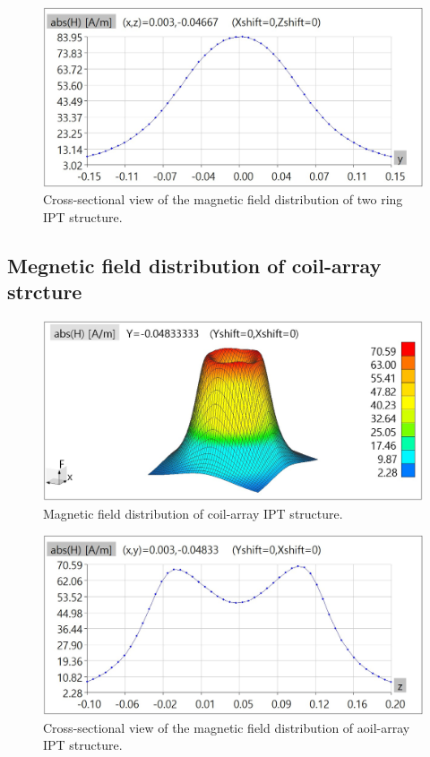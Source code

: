 \begin{figure}[!t]
    \centering
    \includegraphics[width=0.9\linewidth]{images/4_two_ring_near_field_distribution_cut.JPG}
    \caption{Cross-sectional view of the magnetic field distribution of two ring IPT structure.}
    \label{fig: magnetic distribution of two ring cut}
\end{figure}


\subsection{Megnetic field distribution of coil-array strcture}

\begin{figure}[!t]
    \centering
    \includegraphics[width=0.9\linewidth]{images/4_coil_array_near_field_distribution.JPG}
    \caption{Magnetic field distribution of coil-array IPT structure.}
    \label{fig: magnetic distribution of coil array}
\end{figure}

\begin{figure}[!t]
    \centering
    \includegraphics[width=0.9\linewidth]{images/4_coil_array_near_field_distribution_cut.JPG}
    \caption{Cross-sectional view of the magnetic field distribution of aoil-array IPT structure.}
    \label{fig: magnetic distribution of coil array cut}
\end{figure}

